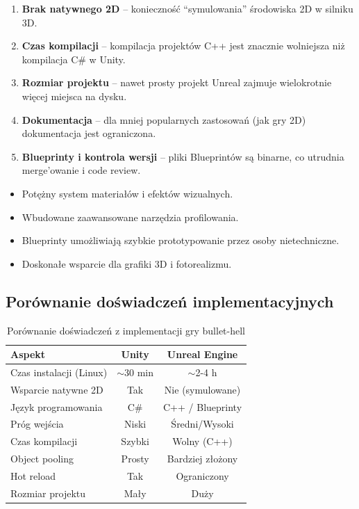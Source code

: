 \begin{enumerate}
    \item \textbf{Brak natywnego 2D} -- konieczność ``symulowania'' środowiska 2D w silniku 3D.
    \item \textbf{Czas kompilacji} -- kompilacja projektów C++ jest znacznie wolniejsza niż kompilacja C\# w Unity.
    \item \textbf{Rozmiar projektu} -- nawet prosty projekt Unreal zajmuje wielokrotnie więcej miejsca na dysku.
    \item \textbf{Dokumentacja} -- dla mniej popularnych zastosowań (jak gry 2D) dokumentacja jest ograniczona.
    \item \textbf{Blueprinty i kontrola wersji} -- pliki Blueprintów są binarne, co utrudnia merge'owanie i code review.
\end{enumerate}


\begin{itemize}
    \item Potężny system materiałów i efektów wizualnych.
    \item Wbudowane zaawansowane narzędzia profilowania.
    \item Blueprinty umożliwiają szybkie prototypowanie przez osoby nietechniczne.
    \item Doskonałe wsparcie dla grafiki 3D i fotorealizmu.
\end{itemize}

\subsection{Porównanie doświadczeń implementacyjnych}

\begin{table}[htbp]
\centering
\caption{Porównanie doświadczeń z implementacji gry bullet-hell}
\label{tab:impl-comparison}
\begin{tabular}{|l|c|c|}
\hline
\textbf{Aspekt} & \textbf{Unity} & \textbf{Unreal Engine} \\
\hline
Czas instalacji (Linux) & $\sim$30 min & $\sim$2-4 h \\
\hline
Wsparcie natywne 2D & Tak & Nie (symulowane) \\
\hline
Język programowania & C\# & C++ / Blueprinty \\
\hline
Próg wejścia & Niski & Średni/Wysoki \\
\hline
Czas kompilacji & Szybki & Wolny (C++) \\
\hline
Object pooling & Prosty & Bardziej złożony \\
\hline
Hot reload & Tak & Ograniczony \\
\hline
Rozmiar projektu & Mały & Duży \\
\hline
\end{tabular}
\end{table}
\newpage
